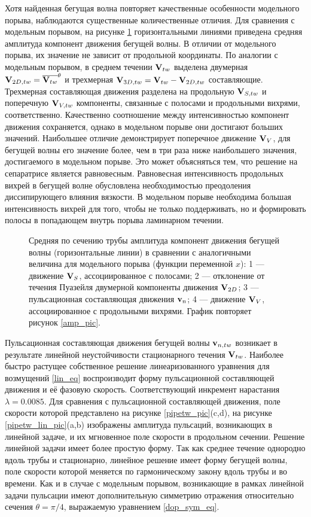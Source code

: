 Хотя найденная бегущая волна повторяет качественные особенности модельного порыва, наблюдаются существенные количественные отличия. Для сравнения с модельным порывом, на рисунке \ref{pipetw_amp_pic} горизонтальными линиями приведена средняя амплитуда компонент движения бегущей волны. В отличии от модельного порыва, их значение не зависит от продольной координаты. По аналогии с модельным порывом, в среднем течении $\mathbf{V}_{tw}$ выделена двумерная $\mathbf{V}_{2D,tw} = \overline{\mathbf{V}_{tw}}^\theta$ и трехмерная  $\mathbf{V}_{3D,tw} = \mathbf{V}_{tw} - \mathbf{V}_{2D,tw}$ составляющие. Трехмерная составляющая движения разделена на продольную $\mathbf{V}_{S,tw}$ и поперечную $\mathbf{V}_{V,tw}$ компоненты, связанные с полосами и продольными вихрями, соответственно. Качественно соотношение между интенсивностью компонент движения сохраняется, однако в модельном порыве они достигают больших значений. Наибольшее отличие демонстрирует поперечное движение $\mathbf{V}_V$, для бегущей волны его значение более, чем в три раза ниже наибольшего значения, достигаемого в модельном порыве. Это может объясняться тем, что решение на сепаратрисе является равновесным. Равновесная интенсивность продольных вихрей в бегущей волне обусловлена необходимостью преодоления диссипирующего влияния вязкости. В модельном порыве необходима большая интенсивность вихрей для того, чтобы не только поддерживать, но и формировать полосы в попадающем внутрь порыва ламинарном течении. 


\begin{figure}
\caption{Средняя по сечению трубы амплитуда компонент движения бегущей волны (горизонтальные линии) в сравнении с аналогичными величина для модельного порыва (функции переменной $x$): 1 --- движение $\mathbf{V}_S$, ассоциированное с полосами; 2 --- отклонение от течения Пуазейля двумерной компоненты движения $\mathbf{V}_{2D}$; 3 --- пульсационная составляющая движения $\mathbf{v}_n$; 4 --- движение $\mathbf{V}_V$, ассоциированное с продольными вихрями. График повторяет рисунок \ref{amp_pic}.}
\label{pipetw_amp_pic}
\end{figure}

Пульсационная составляющая движения бегущей волны $\mathbf{v}_{n,tw}$ возникает в результате линейной неустойчивости стационарного течения $\mathbf{V}_{tw}$. Наиболее быстро растущее собственное решение линеаризованного уравнения для возмущений \eqref{lin_eq} воспроизводит форму пульсационной составляющей движения и её фазовую скорость. Соответствующий инкремент нарастания $\lambda = 0.0085$. Для сравнения с пульсационной составляющей движения, поле скорости которой представлено на рисунке \ref{pipetw_pic}(c,d), на рисунке \ref{pipetw_lin_pic}(a,b) изображены амплитуда пульсаций, возникающих в линейной задаче, и их мгновенное поле скорости в продольном сечении. Решение линейной задачи имеет более простую форму. Так как среднее течение однородно вдоль трубы и стационарно, линейное решение имеет форму бегущей волны, поле скорости которой меняется по гармоническому закону вдоль трубы и во времени. Как и в случае с модельным порывом, возникающие в рамках линейной задачи пульсации имеют дополнительную симметрию отражения относительно сечения $\theta = \pi/4$, выражаемую уравнением \eqref{dop_sym_eq}. 


